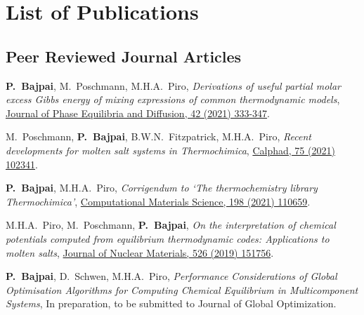 \chapter*{List of Publications}\label{publications}


{
\onehalfspacing

\section*{Peer Reviewed Journal Articles}
\vspace*{1em}
\begin{enumerate}{\small \compresslist
    \item \textbf{P.\ Bajpai}, {M.\ Poschmann}, {M.H.A.\ Piro}, \textit{Derivations of useful partial molar excess Gibbs energy of mixing expressions of common thermodynamic models}, \href{https://doi.org/10.1007/s11669-021-00886-w}{Journal of Phase Equilibria and Diffusion, 42 (2021) 333-347}.
    \item {M.\ Poschmann}, \textbf{P.\ Bajpai}, {B.W.N.\ Fitzpatrick}, {M.H.A.\ Piro}, \textit{Recent developments for molten salt systems in Thermochimica}, \href{https://doi.org/10.1016/j.calphad.2021.102341}{Calphad, 75 (2021) 102341}.
    \item \textbf{P.\ Bajpai}, {M.H.A.\ Piro}, \textit{Corrigendum to `The thermochemistry library Thermochimica'}, \href{https://doi.org/10.1016/j.commatsci.2021.110659}{Computational Materials Science, 198 (2021) 110659}.
    \item {M.H.A.\ Piro}, {M.\ Poschmann}, \textbf{P.\ Bajpai}, \textit{On the interpretation of chemical potentials computed from equilibrium thermodynamic codes: Applications to molten salts}, \href{https://doi.org/10.1016/j.jnucmat.2019.151756}{Journal of Nuclear Materials, 526 (2019) 151756}.
    \item \textbf{P.\ Bajpai}, {D.\ Schwen}, {M.H.A.\ Piro}, \textit{Performance Considerations of Global Optimisation Algorithms for Computing Chemical Equilibrium in Multicomponent Systems}, {In preparation, to be submitted to Journal of Global Optimization}.
}
\end{enumerate}

}
